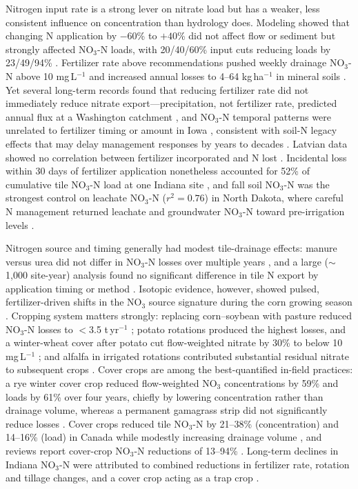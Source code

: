 \documentclass[11pt]{article}
\begin{document}
Nitrogen input rate is a strong lever on nitrate load but has a weaker, less consistent influence on concentration than hydrology does. Modeling showed that changing N application by $-60$\% to $+40$\% did not affect flow or sediment but strongly affected NO$_3$-N loads, with 20/40/60\% input cuts reducing loads by 23/49/94\% \parencite{Chaplot2004}. Fertilizer rate above recommendations pushed weekly drainage NO$_3$-N above 10 mg\,L$^{-1}$ and increased annual losses to 4--64 kg\,ha$^{-1}$ in mineral soils \parencite{MILLER1979}. Yet several long-term records found that reducing fertilizer rate did not immediately reduce nitrate export---precipitation, not fertilizer rate, predicted annual flux at a Washington catchment \parencite{Kelley2017}, and NO$_3$-N temporal patterns were unrelated to fertilizer timing or amount in Iowa \parencite{Cambardella1999}, consistent with soil-N legacy effects that may delay management responses by years to decades \parencite{Bauwe2020}. Latvian data showed no correlation between fertilizer incorporated and N lost \parencite{Siksnane2017}. Incidental loss within 30 days of fertilizer application nonetheless accounted for 52\% of cumulative tile NO$_3$-N load at one Indiana site \parencite{Williams2022}, and fall soil NO$_3$-N was the strongest control on leachate NO$_3$-N ($r^2=0.76$) in North Dakota, where careful N management returned leachate and groundwater NO$_3$-N toward pre-irrigation levels \parencite{Derby2009}.

Nitrogen source and timing generally had modest tile-drainage effects: manure versus urea did not differ in NO$_3$-N losses over multiple years \parencite{Randall2000}, and a large ($\sim$1,000 site-year) analysis found no significant difference in tile N export by application timing or method \parencite{Ward2018}. Isotopic evidence, however, showed pulsed, fertilizer-driven shifts in the NO$_3$ source signature during the corn growing season \parencite{Hu2024}. Cropping system matters strongly: replacing corn--soybean with pasture reduced NO$_3$-N losses to $<$3.5 t\,yr$^{-1}$ \parencite{Chaplot2004}; potato rotations produced the highest losses, and a winter-wheat cover after potato cut flow-weighted nitrate by 30\% to below 10 mg\,L$^{-1}$ \parencite{RITTER1995}; and alfalfa in irrigated rotations contributed substantial residual nitrate to subsequent crops \parencite{ROBBINS1980}. Cover crops are among the best-quantified in-field practices: a rye winter cover crop reduced flow-weighted NO$_3$ concentrations by 59\% and loads by 61\% over four years, chiefly by lowering concentration rather than drainage volume, whereas a permanent gamagrass strip did not significantly reduce losses \parencite{Kaspar2007}. Cover crops reduced tile NO$_3$-N by 21--38\% (concentration) and 14--16\% (load) in Canada while modestly increasing drainage volume \parencite{Drury2014}, and reviews report cover-crop NO$_3$-N reductions of 13--94\% \parencite{Ward2018}. Long-term declines in Indiana NO$_3$-N were attributed to combined reductions in fertilizer rate, rotation and tillage changes, and a cover crop acting as a trap crop \parencite{Kladivko2004,Kladivko2021}.
\end{document}
